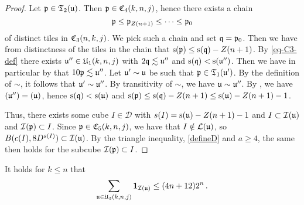 \begin{proof}
    \leanok
    Let ${\mathfrak p} \in \mathfrak{T}_2({\mathfrak u})$. Then ${\mathfrak p} \in {\mathfrak C}_4(k,n,j)$, hence there exists a chain
    $$
        {\mathfrak p} \le {\mathfrak p}_{Z(n+1)} \le \dotsb \le {\mathfrak p}_0
    $$
    of distinct tiles in ${\mathfrak C}_3(n,k,j)$. We pick such a chain and set ${\mathfrak q} = {\mathfrak p}_0$.
    Then we have from distinctness of the tiles in the chain that
    ${\mathrm{s}}({\mathfrak p}) \le {\mathrm{s}}({\mathfrak q}) - Z(n+1)$.
    By \eqref{eq-C3-def} there exists ${\mathfrak u}'' \in {\mathfrak U}_1(k,n,j)$ with $2{\mathfrak q} \lesssim {\mathfrak u}''$ and ${\mathrm{s}}({\mathfrak q}) < {\mathrm{s}}({\mathfrak u}'')$.
    Then we have in particular by  that $10 {\mathfrak p} \lesssim {\mathfrak u}''$.
    Let ${\mathfrak u}' \sim {\mathfrak u}$ be such that ${\mathfrak p} \in \mathfrak{T}_1({\mathfrak u}')$.
    By the definition of $\sim$, it follows that ${\mathfrak u}' \sim {\mathfrak u}''$.
    By transitivity of $\sim$, we have ${\mathfrak u} \sim {\mathfrak u}''$.
    By , we have $\sc({\mathfrak u}'') = \sc({\mathfrak u})$, hence ${\mathrm{s}}({\mathfrak q}) < {\mathrm{s}}({\mathfrak u})$ and ${\mathrm{s}}({\mathfrak p}) \le {\mathrm{s}}({\mathfrak q}) - Z(n+1) \le {\mathrm{s}}({\mathfrak u}) - Z(n+1) - 1$.

    Thus, there exists some cube $I \in \mathcal{D}$ with $s(I) = {\mathrm{s}}({\mathfrak u}) - Z(n+1) - 1$ and $I \subset {\mathcal{I}}({\mathfrak u})$ and ${\mathcal{I}}({\mathfrak p}) \subset I$.
    Since ${\mathfrak p} \in {\mathfrak C}_5(k,n,j)$, we have that $I \notin \mathcal{L}({\mathfrak u})$, so $B(c(I), 8D^{s(I)}) \subset {\mathcal{I}}({\mathfrak u})$.
    By the triangle inequality, \eqref{defineD} and $a \ge 4$, the same then holds for the subcube ${\mathcal{I}}({\mathfrak p}) \subset I$.
\end{proof}


\begin{lemma}
    \label{forest-stacking}
    \leanok
    It holds for $k\le n$ that
    \begin{equation}
        \sum_{{\mathfrak u} \in {\mathfrak U}_3(k,n,j)} \mathbf{1}_{{\mathcal{I}}({\mathfrak u})} \le (4n+12)2^{n}\,.
    \end{equation}
\end{lemma}

